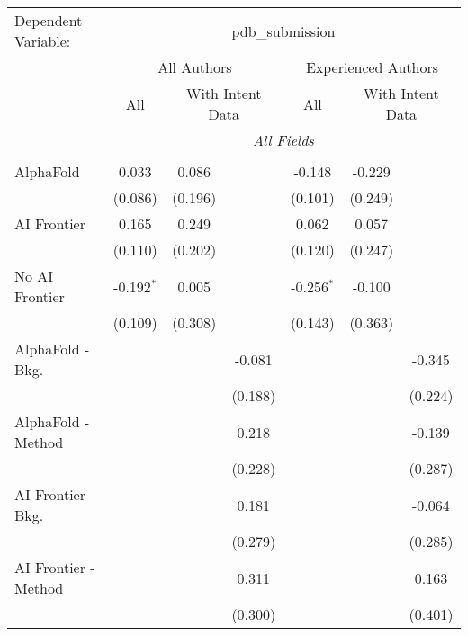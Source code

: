 \begingroup
\centering
\begin{tabular}{lcccccc}
   \tabularnewline \midrule \midrule
   Dependent Variable: & \multicolumn{6}{c}{pdb\_submission}\\
 & \multicolumn{3}{c}{All Authors} & \multicolumn{3}{c}{Experienced Authors} \\
\cmidrule(lr){2-4} \cmidrule(lr){5-7}
 & \multicolumn{1}{c}{All} & \multicolumn{2}{c}{With Intent Data} & \multicolumn{1}{c}{All} & \multicolumn{2}{c}{With Intent Data} \\
\cmidrule(lr){2-2} \cmidrule(lr){3-4} \cmidrule(lr){5-5} \cmidrule(lr){6-7}
 & \multicolumn{6}{c}{\textit{All Fields}} \\ \\
   AlphaFold               & 0.033        & 0.086   &         & -0.148       & -0.229  &   \\   
                           & (0.086)      & (0.196) &         & (0.101)      & (0.249) &   \\   
   AI Frontier             & 0.165        & 0.249   &         & 0.062        & 0.057   &   \\   
                           & (0.110)      & (0.202) &         & (0.120)      & (0.247) &   \\   
   No AI Frontier          & -0.192$^{*}$ & 0.005   &         & -0.256$^{*}$ & -0.100  &   \\   
                           & (0.109)      & (0.308) &         & (0.143)      & (0.363) &   \\   
   AlphaFold - Bkg.        &              &         & -0.081  &              &         & -0.345\\   
                           &              &         & (0.188) &              &         & (0.224)\\   
   AlphaFold - Method      &              &         & 0.218   &              &         & -0.139\\   
                           &              &         & (0.228) &              &         & (0.287)\\   
   AI Frontier - Bkg.      &              &         & 0.181   &              &         & -0.064\\   
                           &              &         & (0.279) &              &         & (0.285)\\   
   AI Frontier - Method    &              &         & 0.311   &              &         & 0.163\\   
                           &              &         & (0.300) &              &         & (0.401)\\   

\end{tabular}
